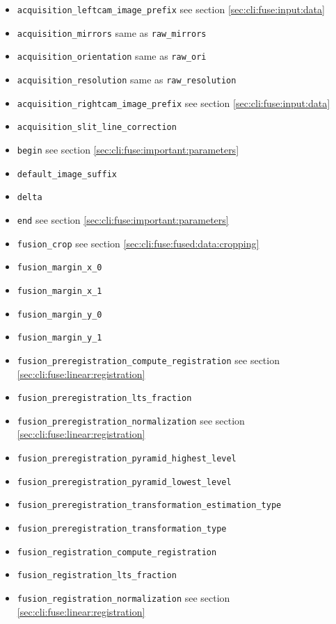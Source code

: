 \begin{itemize}
\item \texttt{acquisition\_leftcam\_image\_prefix}  see section \ref{sec:cli:fuse:input:data}
\item \texttt{acquisition\_mirrors} same as \texttt{raw\_mirrors}
\item \texttt{acquisition\_orientation} same as \texttt{raw\_ori}
\item \texttt{acquisition\_resolution} same as \texttt{raw\_resolution}
\item \texttt{acquisition\_rightcam\_image\_prefix}  see section \ref{sec:cli:fuse:input:data}
\item \texttt{acquisition\_slit\_line\_correction}
\item \texttt{begin} see section \ref{sec:cli:fuse:important:parameters}
\item \texttt{default\_image\_suffix}
\item \texttt{delta}
\item \texttt{end} see section \ref{sec:cli:fuse:important:parameters}
\item \texttt{fusion\_crop} see section \ref{sec:cli:fuse:fused:data:cropping}
\item \texttt{fusion\_margin\_x\_0}
\item \texttt{fusion\_margin\_x\_1}
\item \texttt{fusion\_margin\_y\_0}
\item \texttt{fusion\_margin\_y\_1}
\item \texttt{fusion\_preregistration\_compute\_registration} see section \ref{sec:cli:fuse:linear:registration}
\item \texttt{fusion\_preregistration\_lts\_fraction}
\item \texttt{fusion\_preregistration\_normalization} see section \ref{sec:cli:fuse:linear:registration}
\item \texttt{fusion\_preregistration\_pyramid\_highest\_level}
\item \texttt{fusion\_preregistration\_pyramid\_lowest\_level}
\item \texttt{fusion\_preregistration\_transformation\_estimation\_type}
\item \texttt{fusion\_preregistration\_transformation\_type}
\item \texttt{fusion\_registration\_compute\_registration}
\item \texttt{fusion\_registration\_lts\_fraction}
\item \texttt{fusion\_registration\_normalization} see section \ref{sec:cli:fuse:linear:registration}

\end{itemize}
